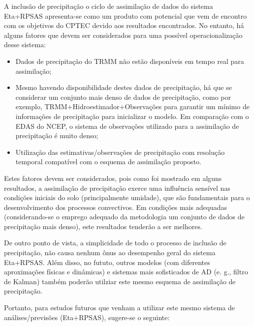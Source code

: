 A inclusão de precipitação o ciclo de assimilação de dados do sistema Eta+RPSAS apresenta-se como um produto com potencial que vem de encontro com os objetivos do CPTEC devido aos resultados encontrados. No entanto, há alguns fatores que devem ser considerados para uma possível operacionalização desse sistema:

\begin{itemize}
\item Dados de precipitação do TRMM não estão disponíveis em tempo real para assimilação;
\item Mesmo havendo disponibilidade destes dados de precipitação, há que se considerar um conjunto mais denso de dados de precipitação, como por exemplo, TRMM+Hidroestimador+Observações para garantir um mínimo de informações de precipitação para inicializar o modelo. Em comparação com o EDAS do NCEP, o sistema de observações utilizado para a assimilação de precipitação é muito denso;
\item Utilização das estimativas/observações de precipitação com resolução temporal compatível com o esquema de assimilação proposto.
\end{itemize}

Estes fatores devem ser considerados, pois como foi mostrado em alguns resultados, a assimilação de precipitação exerce uma influência sensível nas condições iniciais do solo (principalmente umidade), que são fundamentais para o desenvolvimento dos processos convectivos. Em condições mais adequadas (considerando-se o emprego adequado da metodologia um conjunto de dados de precipitação mais denso), este resultados tenderão a ser melhores.

De outro ponto de vista, a simplicidade de todo o processo de inclusão de precipitação, não causa nenhum ônus ao desempenho geral do sistema Eta+RPSAS. Além disso, no fututo, outros modelos (com diferentes aproximações físicas e dinâmicas) e sistemas mais sofisticados de AD (e. g., filtro de Kalman) também poderão utilziar este mesmo esquema de assimilação de precipitação.

Portanto, para estudos futuros que venham a utilizar este mesmo sistema de análises/previsões (Eta+RPSAS), sugere-se o seguinte:

